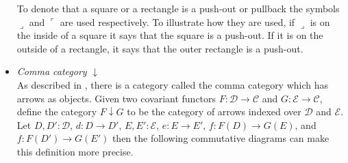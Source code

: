 \begin{itemize}
\begin{center}
        \end{center}
        To denote that a square or a rectangle is a push-out or pullback the symbols $\lrcorner$ and $\ulcorner$ are used respectively. To illustrate how they are used, if $\lrcorner$ is on the inside of a square it says that the square is a push-out. If it is on the outside of a rectangle, it says that the outer rectangle is a push-out.
        \begin{center}
        \end{center}
        \item \emph{Comma category} $\downarrow$ \\
        As described in \cite{Mac71}, there is a category called the comma category which has arrows as objects. Given two covariant functors $F:\mathcal{D}\rightarrow\mathcal{C}$ and $G:\mathcal{E}\rightarrow\mathcal{C}$, define the category $F\downarrow G$ to be the category of arrows indexed over $\mathcal{D}$ and $\mathcal{E}$. Let $D,D':\mathcal{D}$, $d:D\rightarrow D'$, $E,E':\mathcal{E}$, $e:E\rightarrow E'$, $f:F(D)\rightarrow G(E)$, and $f:F(D')\rightarrow G(E')$ then the following commutative diagrams can make this definition more precise.

\end{itemize}
